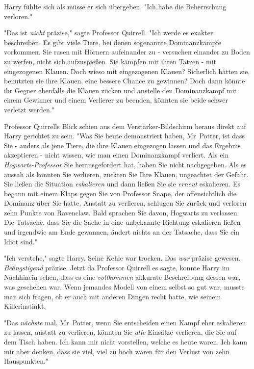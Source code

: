 {Harry fühlte sich als müsse er sich übergeben. "Ich habe die Beherrschung verloren."

"Das ist \emph{nicht} präzise," sagte Professor Quirrell. "Ich werde es exakter beschreiben. Es gibt viele Tiere, bei denen sogenannte Dominanzkämpfe vorkommen. Sie rasen mit Hörnern aufeinander zu - versuchen einander zu Boden zu werfen, nicht sich aufzuspießen. Sie kämpfen mit ihren Tatzen - mit eingezogenen Klauen. Doch wieso mit eingezogenen Klauen? Sicherlich hätten sie, benutzten sie ihre Klauen, eine bessere Chance zu gewinnen? Doch dann könnte ihr Gegner ebenfalls die Klauen zücken und anstelle den Dominanzkampf mit einem Gewinner und einem Verlierer zu beenden, könnten sie beide schwer verletzt werden."

Professor Quirrells Blick schien aus dem Verstärker-Bildschirm heraus direkt auf Harry gerichtet zu sein. "Was Sie heute demonstriert haben, Mr~Potter, ist dass Sie - anders als jene Tiere, die ihre Klauen eingezogen lassen und das Ergebnis akzeptieren - nicht wissen, wie man einen Dominanzkampf verliert. Als ein \emph{Hogwarts-Professor} Sie herausgefordert hat, haben Sie nicht nachgegeben. Als es aussah als könnten Sie verlieren, zückten Sie Ihre Klauen, ungeachtet der Gefahr. Sie ließen die Situation \emph{eskalieren} und dann ließen Sie sie \emph{erneut} eskalieren. Es begann mit einem Klaps gegen Sie von Professor Snape, der offensichtlich die Dominanz über Sie hatte. Anstatt zu verlieren, schlugen Sie zurück und verloren zehn Punkte von Ravenclaw. Bald sprachen Sie davon, Hogwarts zu verlassen. Die Tatsache, dass Sie die Sache in eine unbekannte Richtung eskalieren ließen und irgendwie am Ende gewannen, ändert nichts an der Tatsache, dass Sie ein Idiot sind."

"Ich verstehe," sagte Harry. Seine Kehle war trocken. Das \emph{war} präzise gewesen. \emph{Beängstigend} präzise. Jetzt da Professor Quirrell es sagte, konnte Harry im Nachhinein sehen, dass es eine \emph{vollkommen} akkurate Beschreibung dessen war, was geschehen war. Wenn jemandes Modell von einem selbst so gut war, musste man sich fragen, ob er auch mit anderen Dingen recht hatte, wie seinem Killerinstinkt.

"Das \emph{nächste} mal, Mr~Potter, wenn Sie entscheiden einen Kampf eher eskalieren zu lassen, anstatt zu verlieren, könnten Sie \emph{alle} Einsätze verlieren, die Sie auf dem Tisch haben. Ich kann mir nicht vorstellen, welche es heute waren. Ich kann mir aber denken, dass sie viel, viel zu hoch waren für den Verlust von zehn Hauspunkten."

}
